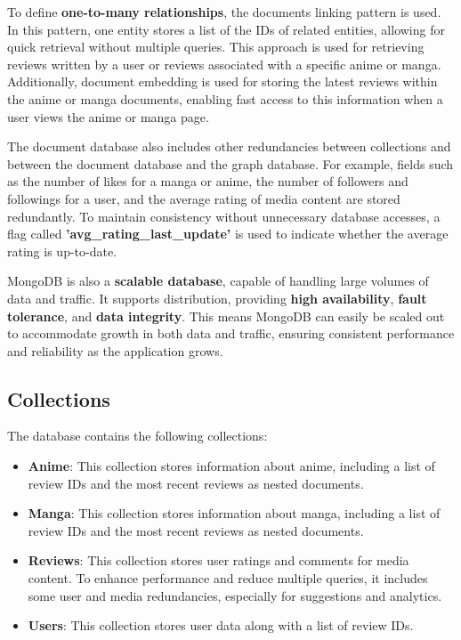 \vspace{\baselineskip}

To define \textbf{one-to-many relationships}, the documents linking pattern is used.
In this pattern, one entity stores a list of the IDs of related entities, allowing for
quick retrieval without multiple queries. This approach is used for retrieving reviews
written by a user or reviews associated with a specific anime or manga. Additionally, document
embedding is used for storing the latest reviews within the anime or manga documents, enabling
fast access to this information when a user views the anime or manga page.

\vspace{\baselineskip}

The document database also includes other redundancies between collections and between the document
database and the graph database. For example, fields such as the number of likes for a manga or
anime, the number of followers and followings for a user, and the average rating of media content
are stored redundantly. To maintain consistency without unnecessary database accesses, a flag
called \textbf{'avg\_rating\_last\_update'} is used to indicate whether the average rating is
up-to-date.

\vspace{\baselineskip}

MongoDB is also a \textbf{scalable database}, capable of handling large volumes of data and traffic.
It supports distribution, providing \textbf{high availability}, \textbf{fault tolerance}, and \textbf{data integrity}.
This means MongoDB can easily be scaled out to accommodate growth in both data and traffic, ensuring consistent
performance and reliability as the application grows.


\vspace{\baselineskip}

\subsection*{Collections}
The database contains the following collections:
\begin{itemize}
    \item \textbf{Anime}:
    This collection stores information about anime, including a list of review IDs and the most recent reviews as nested documents.

    \item \textbf{Manga}:
    This collection stores information about manga, including a list of review IDs and the most recent reviews as nested documents.

    \item \textbf{Reviews}:
    This collection stores user ratings and comments for media content. To enhance performance and reduce multiple queries, it
    includes some user and media redundancies, especially for suggestions and analytics.

    \item \textbf{Users}:
    This collection stores user data along with a list of review IDs.
\end{itemize}

